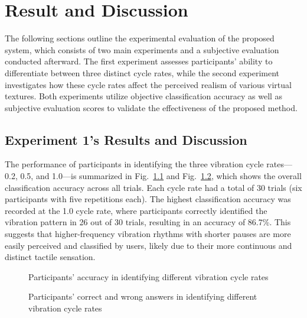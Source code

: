 \chapter{Result and Discussion} %

\label{Chapter5} %


The following sections outline the experimental evaluation of the proposed system, which consists of two main experiments and a subjective evaluation conducted afterward. The first experiment assesses participants' ability to differentiate between three distinct cycle rates, while the second experiment investigates how these cycle rates affect the perceived realism of various virtual textures. Both experiments utilize objective classification accuracy as well as subjective evaluation scores to validate the effectiveness of the proposed method.

\section{Experiment 1's Results and Discussion}
The performance of participants in identifying the three vibration cycle rates—0.2, 0.5, and 1.0—is summarized in Fig.~\ref{fig:ex1_results} and Fig.~\ref{fig:C_W_ex1}, which shows the overall classification accuracy across all trials. Each cycle rate had a total of 30 trials (six participants with five repetitions each). The highest classification accuracy was recorded at the 1.0 cycle rate, where participants correctly identified the vibration pattern in 26 out of 30 trials, resulting in an accuracy of 86.7\%. This suggests that higher-frequency vibration rhythms with shorter pauses are more easily perceived and classified by users, likely due to their more continuous and distinct tactile sensation.

\begin{figure}[H]\centering
	
	\caption{Participants' accuracy in identifying different vibration cycle rates}\label{fig:ex1_results}
\end{figure}

\begin{figure}[H]\centering
	
	\caption{Participants' correct and wrong answers in identifying different vibration cycle rates}\label{fig:C_W_ex1}
\end{figure}


